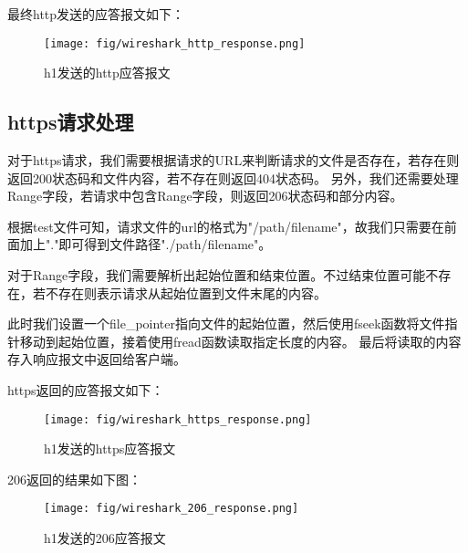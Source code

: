 \documentclass[11pt]{article}
\begin{document}
最终http发送的应答报文如下：
\begin{figure}[H]
\centering
\texttt{[image: fig/wireshark\_http\_response.png]}
\caption{h1发送的http应答报文}
\end{figure}

\subsection{https请求处理}
对于https请求，我们需要根据请求的URL来判断请求的文件是否存在，若存在则返回200状态码和文件内容，若不存在则返回404状态码。
另外，我们还需要处理Range字段，若请求中包含Range字段，则返回206状态码和部分内容。

根据test文件可知，请求文件的url的格式为"/path/filename"，故我们只需要在前面加上"."即可得到文件路径"./path/filename"。

对于Range字段，我们需要解析出起始位置和结束位置。不过结束位置可能不存在，若不存在则表示请求从起始位置到文件末尾的内容。

此时我们设置一个file\_pointer指向文件的起始位置，然后使用fseek函数将文件指针移动到起始位置，接着使用fread函数读取指定长度的内容。
最后将读取的内容存入响应报文中返回给客户端。

https返回的应答报文如下：
\begin{figure}[H]
\centering
\texttt{[image: fig/wireshark\_https\_response.png]}
\caption{h1发送的https应答报文}
\end{figure}

206返回的结果如下图：
\begin{figure}[H]
\centering
\texttt{[image: fig/wireshark\_206\_response.png]}
\caption{h1发送的206应答报文}
\end{figure}
\end{document}
